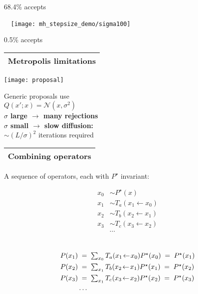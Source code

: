 \documentclass[25pt,landscape]{foils}
\newcommand{\Red}{\textcolor{red}}
\newcommand{\Gray}{\textcolor{mygray}}
\newcommand{\Green}{\textcolor{mypine}}
\newcommand{\myfoilhead}[1]{
\newpage
\vspace*{-1cm}
\Gray{
\begin{tabular*}{\textwidth}{l}
{\bf \Huge #1} \\
\bottomrule
\end{tabular*}}}
\newcommand{\N}{\mathcal{N}}
\newcommand{\la}{\!\leftarrow\!}
\begin{document}
\vspace*{-2cm}
{\small 68.4\% accepts}
\vspace*{1cm}

\vfill {}~~\texttt{[image: mh\_stepsize\_demo/sigma100]}

\vspace*{-2cm}
{\small 0.5\% accepts}


\myfoilhead{Metropolis limitations}

\vfill

\begin{minipage}{0.5\textwidth}
    \texttt{[image: proposal]}
\end{minipage}
\begin{minipage}{0.49\textwidth}
    Generic proposals use\\$Q(x';x)=\N(x,\sigma^2)$\\

    \Green{\bf $\sigma$ large $\rightarrow$ many rejections}\\

    \Green{\bf $\sigma$ small $\rightarrow$ slow diffusion:}\\
    $\sim\!(L/\sigma)^2$ iterations required
\end{minipage}

\vfill



\myfoilhead{Combining operators}

\vfill
A sequence of operators, each with $P^\star$ invariant:\\[-0.2in]

\hspace*{-1cm}\begin{minipage}{0.3\linewidth}
\[
\begin{split}
x_0 &\sim P^\star(x)\\
x_1 &\sim T_a(x_1\la x_0)\\
x_2 &\sim T_b(x_2\la x_1)\\
x_3 &\sim T_c(x_3\la x_2)\\
&\cdots
\end{split}
\]
\end{minipage}
\hspace*{1cm}
\begin{minipage}{0.7\linewidth}
\[
\begin{split}
    \mbox{\phantom{$P^\star(x)$}} &\\
P(x_1) &\;=\; \textstyle \sum_{x_0} T_a(x_1\la x_0) P^\star(x_0) \;=\; P^\star(x_1)\\
P(x_2) &\;=\; \textstyle \sum_{x_1} T_b(x_2\la x_1) P^\star(x_1) \;=\; P^\star(x_2)\\
P(x_3) &\;=\; \textstyle \sum_{x_1} T_c(x_3\la x_2) P^\star(x_2) \;=\; P^\star(x_3)\\
&\cdots
\end{split}
\]
\end{minipage}
\end{document}
